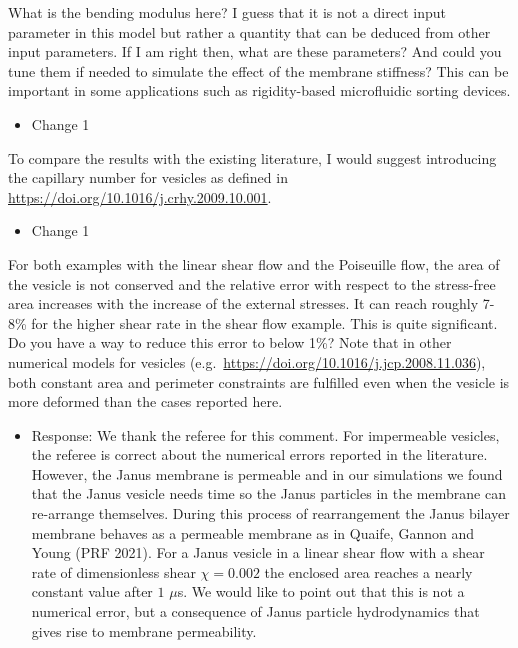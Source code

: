 \documentclass[11pt]{article}
\newcommand{\comment}[1]{{\color{blue} #1}}
\begin{document}
\noindent
\comment{What is the bending modulus here? I guess that it is not a
direct input parameter in this model but rather a quantity that can be
deduced from other input parameters. If I am right then, what are these
parameters? And could you tune them if needed to simulate the effect of
the membrane stiffness? This can be important in some applications such
as rigidity-based microfluidic sorting devices.}
\begin{itemize}
  \item Change 1 
\end{itemize}

\noindent
\comment{To compare the results with the existing literature, I would
suggest introducing the capillary number for vesicles as defined in
\url{https://doi.org/10.1016/j.crhy.2009.10.001}.}
\begin{itemize}
  \item Change 1 
\end{itemize}

\noindent
\comment{For both examples with the linear shear flow and the Poiseuille
flow, the area of the vesicle is not conserved and the relative error
with respect to the stress-free area increases with the increase of the
external stresses. It can reach roughly 7-8\% for the higher shear rate
in the shear flow example. This is quite significant. Do you have a way
to reduce this error to below 1\%? Note that in other numerical models
for vesicles (e.g.~\url{https://doi.org/10.1016/j.jcp.2008.11.036}),
both constant area and perimeter constraints are fulfilled even when the
vesicle is more deformed than the cases reported here.}
\begin{itemize}
  \item Response: We thank the referee for this comment. For impermeable vesicles, the referee is correct about the numerical errors reported in the literature. However, the Janus membrane is permeable and in our simulations we found that the Janus vesicle needs time so the Janus particles in the membrane can re-arrange themselves. During this process of rearrangement the Janus bilayer membrane behaves as a permeable membrane as in Quaife, Gannon and Young (PRF 2021). For a Janus vesicle in a linear shear flow with a shear rate of dimensionless shear $\chi = 0.002$ the enclosed area reaches a nearly constant value after $1$ $\mu$s. We would like to point out that this is not a numerical error, but a consequence of Janus particle hydrodynamics that gives rise to membrane permeability. 
\end{itemize}
\end{document}
